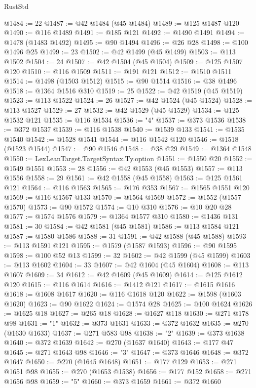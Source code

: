 \begin{lexlean}{RustStd}
\begin{coremodule}
@1484 := 22
@1487 := @42 @1484 (@45 @1484)
@1489 := @125 @1487 @120
@1490 := @116 @1489
@1491 := @185 @121
@1492 := @1490 @1491
@1494 := @1478 (@1483 @1492)
@1495 := @90 @1494
@1496 := @26 @28
@1498 := @100 @1496 @25
@1499 := 23
@1502 := @42 @1499 (@45 @1499)
@1503 := @113 @1502
@1504 := 24
@1507 := @42 @1504 (@45 @1504)
@1509 := @125 @1507 @120
@1510 := @116 @1509
@1511 := @191 @121
@1512 := @1510 @1511
@1514 := @1498 (@1503 @1512)
@1515 := @90 @1514
@1516 := @38 @1496
@1518 := @1364 @1516 @310
@1519 := 25
@1522 := @42 @1519 (@45 @1519)
@1523 := @113 @1522
@1524 := 26
@1527 := @42 @1524 (@45 @1524)
@1528 := @113 @1527
@1529 := 27
@1532 := @42 @1529 (@45 @1529)
@1534 := @125 @1532 @121
@1535 := @116 @1534
@1536 := "4"
@1537 := @373 @1536
@1538 := @372 @1537
@1539 := @116 @1538
@1540 := @1539 @133
@1541 := @1535 @1540
@1542 := @1528 @1541
@1544 := @116 @1542 @120
@1546 := @1518 (@1523 @1544)
@1547 := @90 @1546
@1548 := @38 @29
@1549 := @1364 @1548
@1550 := LexLeanTarget.TargetSyntax.Ty.option
@1551 := @1550 @20
@1552 := @1549 @1551
@1553 := 28
@1556 := @42 @1553 (@45 @1553)
@1557 := @113 @1556
@1558 := 29
@1561 := @42 @1558 (@45 @1558)
@1563 := @125 @1561 @121
@1564 := @116 @1563
@1565 := @176 @353
@1567 := @1565 @1551 @120
@1569 := @116 @1567 @133
@1570 := @1564 @1569
@1572 := @1552 (@1557 @1570)
@1573 := @90 @1572
@1574 := @10 @310
@1576 := @10 @20 @28
@1577 := @1574 @1576
@1579 := @1364 @1577 @310
@1580 := @1436 @131
@1581 := 30
@1584 := @42 @1581 (@45 @1581)
@1586 := @113 @1584 @121
@1587 := @1580 @1586
@1588 := 31
@1591 := @42 @1588 (@45 @1588)
@1593 := @113 @1591 @121
@1595 := @1579 (@1587 @1593)
@1596 := @90 @1595
@1598 := @100 @52 @13
@1599 := 32
@1602 := @42 @1599 (@45 @1599)
@1603 := @113 @1602
@1604 := 33
@1607 := @42 @1604 (@45 @1604)
@1608 := @113 @1607
@1609 := 34
@1612 := @42 @1609 (@45 @1609)
@1614 := @125 @1612 @120
@1615 := @116 @1614
@1616 := @1412 @121
@1617 := @1615 @1616
@1618 := @1608 @1617
@1620 := @116 @1618 @120
@1622 := @1598 (@1603 @1620)
@1623 := @90 @1622
@1624 := @1574 @28
@1625 := @100 @1624
@1626 := @1625 @18
@1627 := @265 @18
@1628 := @1627 @118
@1630 := @271 @178 @98
@1631 := "1"
@1632 := @373 @1631
@1633 := @372 @1632
@1635 := @270 (@1630 @1633)
@1637 := @271 @583 @98
@1638 := "2"
@1639 := @373 @1638
@1640 := @372 @1639
@1642 := @270 (@1637 @1640)
@1643 := @177 @47
@1645 := @271 @1643 @98
@1646 := "3"
@1647 := @373 @1646
@1648 := @372 @1647
@1650 := @270 (@1645 @1648)
@1651 := @177 @129
@1653 := @271 @1651 @98
@1655 := @270 (@1653 @1538)
@1656 := @177 @152
@1658 := @271 @1656 @98
@1659 := "5"
@1660 := @373 @1659
@1661 := @372 @1660

\end{coremodule}
\end{lexlean}
